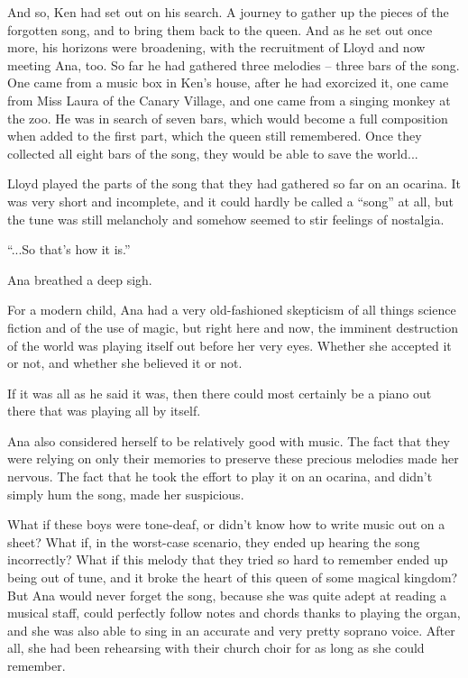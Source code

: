 \documentclass[
]{article}
\begin{document}
And so, Ken had set out on his search. A journey to gather up the pieces
of the forgotten song, and to bring them back to the queen. And as he
set out once more, his horizons were broadening, with the recruitment of
Lloyd and now meeting Ana, too. So far he had gathered three melodies --
three bars of the song. One came from a music box in Ken's house, after
he had exorcized it, one came from Miss Laura of the Canary Village, and
one came from a singing monkey at the zoo. He was in search of seven
bars, which would become a full composition when added to the first
part, which the queen still remembered. Once they collected all eight
bars of the song, they would be able to save the world...

Lloyd played the parts of the song that they had gathered so far on an
ocarina. It was very short and incomplete, and it could hardly be called
a ``song'' at all, but the tune was still melancholy and somehow seemed
to stir feelings of nostalgia.

``...So that's how it is.''

Ana breathed a deep sigh.

For a modern child, Ana had a very old-fashioned skepticism of all
things science fiction and of the use of magic, but right here and now,
the imminent destruction of the world was playing itself out before her
very eyes. Whether she accepted it or not, and whether she believed it
or not.

If it was all as he said it was, then there could most certainly be a
piano out there that was playing all by itself.

Ana also considered herself to be relatively good with music. The fact
that they were relying on only their memories to preserve these precious
melodies made her nervous. The fact that he took the effort to play it
on an ocarina, and didn't simply hum the song, made her suspicious.

What if these boys were tone-deaf, or didn't know how to write music out
on a sheet? What if, in the worst-case scenario, they ended up hearing
the song incorrectly? What if this melody that they tried so hard to
remember ended up being out of tune, and it broke the heart of this
queen of some magical kingdom? But Ana would never forget the song,
because she was quite adept at reading a musical staff, could perfectly
follow notes and chords thanks to playing the organ, and she was also
able to sing in an accurate and very pretty soprano voice. After all,
she had been rehearsing with their church choir for as long as she could
remember.
\end{document}
